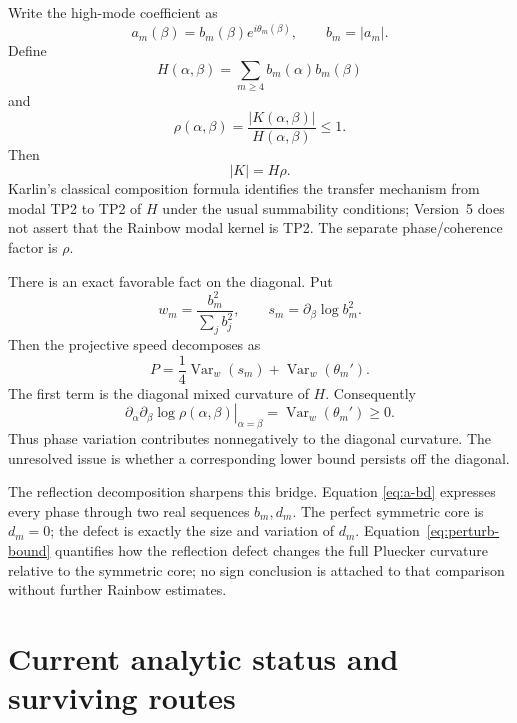 \documentclass[11pt]{amsart}
\numberwithin{equation}{section}
\theoremstyle{plain}
\theoremstyle{definition}
\theoremstyle{remark}
\begin{document}
Write the high-mode coefficient as
\begin{equation}
a_m(\beta)=b_m(\beta)e^{i\theta_m(\beta)},
\qquad b_m=|a_m|.
\end{equation}
Define
\begin{equation}
H(\alpha,\beta)=\sum_{m\ge4}b_m(\alpha)b_m(\beta)
\end{equation}
and
\begin{equation}
\boxed{
\rho(\alpha,\beta)
=\frac{|K(\alpha,\beta)|}{H(\alpha,\beta)}\le1.
}
\label{eq:rho}
\end{equation}
Then
\begin{equation}
|K|=H\rho.
\label{eq:factor-Hrho}
\end{equation}
Karlin's classical composition formula identifies the transfer mechanism from modal TP2 to TP2 of $H$ under the usual summability conditions; Version~5 does not assert that the Rainbow modal kernel is TP2.  The separate phase/coherence factor is $\rho$.

There is an exact favorable fact on the diagonal.  Put
\begin{equation}
w_m=\frac{b_m^2}{\sum_jb_j^2},
\qquad
s_m=\partial_\beta\log b_m^2.
\end{equation}
Then the projective speed decomposes as
\begin{equation}
\boxed{
P
=\frac14\operatorname{Var}_{w}(s_m)
+\operatorname{Var}_{w}(\theta_m').
}
\label{eq:P-phase}
\end{equation}
The first term is the diagonal mixed curvature of $H$.  Consequently
\begin{equation}
\boxed{
\left.\partial_\alpha\partial_\beta\log\rho(\alpha,\beta)\right|_{\alpha=\beta}
=\operatorname{Var}_{w}(\theta_m')\ge0.
}
\label{eq:rho-diagonal}
\end{equation}
Thus phase variation contributes nonnegatively to the diagonal curvature.  The unresolved issue is whether a corresponding lower bound persists off the diagonal.

The reflection decomposition sharpens this bridge.  Equation \eqref{eq:a-bd} expresses every phase through two real sequences $b_m,d_m$.  The perfect symmetric core is $d_m=0$; the defect is exactly the size and variation of $d_m$.  Equation~\eqref{eq:perturb-bound} quantifies how the reflection defect changes the full Pluecker curvature relative to the symmetric core; no sign conclusion is attached to that comparison without further Rainbow estimates.

\section{Current analytic status and surviving routes}
\label{sec:architecture}
\end{document}
